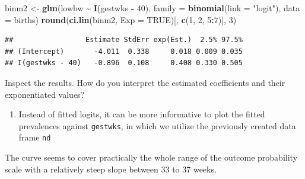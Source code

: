 \documentclass[
]{book}
\newenvironment{Shaded}{\begin{snugshade}}{\end{snugshade}}
\newcommand{\AttributeTok}[1]{\textcolor[rgb]{0.13,0.29,0.53}{#1}}
\newcommand{\ConstantTok}[1]{\textcolor[rgb]{0.56,0.35,0.01}{#1}}
\newcommand{\DecValTok}[1]{\textcolor[rgb]{0.00,0.00,0.81}{#1}}
\newcommand{\FunctionTok}[1]{\textcolor[rgb]{0.13,0.29,0.53}{\textbf{#1}}}
\newcommand{\NormalTok}[1]{#1}
\newcommand{\OtherTok}[1]{\textcolor[rgb]{0.56,0.35,0.01}{#1}}
\newcommand{\SpecialCharTok}[1]{\textcolor[rgb]{0.81,0.36,0.00}{\textbf{#1}}}
\newcommand{\StringTok}[1]{\textcolor[rgb]{0.31,0.60,0.02}{#1}}
\providecommand{\tightlist}{%
  \setlength{\itemsep}{0pt}\setlength{\parskip}{0pt}}
\begin{document}
\begin{Shaded}
\begin{Highlighting}[]
\NormalTok{binm2 }\OtherTok{\textless{}{-}} \FunctionTok{glm}\NormalTok{(lowbw }\SpecialCharTok{\textasciitilde{}} \FunctionTok{I}\NormalTok{(gestwks }\SpecialCharTok{{-}} \DecValTok{40}\NormalTok{), }\AttributeTok{family =} \FunctionTok{binomial}\NormalTok{(}\AttributeTok{link =} \StringTok{"logit"}\NormalTok{), }\AttributeTok{data =}\NormalTok{ births)}
\FunctionTok{round}\NormalTok{(}\FunctionTok{ci.lin}\NormalTok{(binm2, }\AttributeTok{Exp =} \ConstantTok{TRUE}\NormalTok{)[, }\FunctionTok{c}\NormalTok{(}\DecValTok{1}\NormalTok{, }\DecValTok{2}\NormalTok{, }\DecValTok{5}\SpecialCharTok{:}\DecValTok{7}\NormalTok{)], }\DecValTok{3}\NormalTok{)}
\end{Highlighting}
\end{Shaded}

\begin{verbatim}
##                 Estimate StdErr exp(Est.)  2.5% 97.5%
## (Intercept)       -4.011  0.338     0.018 0.009 0.035
## I(gestwks - 40)   -0.896  0.108     0.408 0.330 0.505
\end{verbatim}

Inspect the results. How do you interpret the estimated coefficients
and their exponentiated values?

\begin{enumerate}
\def\labelenumi{\arabic{enumi}.}
\setcounter{enumi}{5}
\tightlist
\item
  Instead of fitted logits, it can be more informative
  to plot the fitted prevalences against \texttt{gestwks},
  in which we utilize the previously created data frame \texttt{nd}
\end{enumerate}

\begin{Shaded}
\end{Shaded}

The curve seems to cover practically the whole range of
the outcome probability scale with a relatively
steep slope between 33 to 37 weeks.
\end{document}

